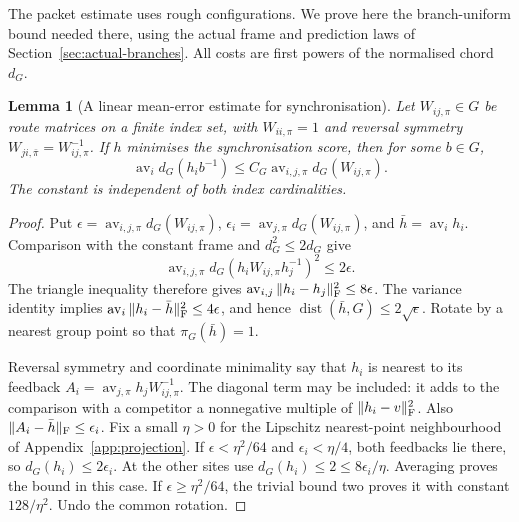 \documentclass[11pt,reqno]{amsart}
\numberwithin{equation}{section}
\newtheorem{lemma}[theorem]{Lemma}
\theoremstyle{definition}
\theoremstyle{remark}
\begin{document}
The packet estimate uses rough configurations. We prove here the
branch-uniform bound needed there, using the actual frame and
prediction laws of Section~\ref{sec:actual-branches}. All costs
are first powers of the normalised chord \(d_G\).

\begin{lemma}[A linear mean-error estimate for synchronisation]
\label{lem:packet-frame-mean}
Let \(W_{ij,\pi}\in G\) be route matrices on a finite index set,
with \(W_{ii,\pi}=1\) and reversal symmetry
\(W_{ji,\bar\pi}=W_{ij,\pi}^{-1}\). If \(h\) minimises the
synchronisation score, then for some \(b\in G\),
\[
 \operatorname{av}_i d_G(h_i b^{-1})
              \le C_G\operatorname{av}_{i,j,\pi}d_G(W_{ij,\pi}).
\]
The constant is independent of both index cardinalities.
\end{lemma}
\begin{proof}
Put \(\epsilon=\operatorname{av}_{i,j,\pi}d_G(W_{ij,\pi})\),
\(\epsilon_i=\operatorname{av}_{j,\pi}d_G(W_{ij,\pi})\), and
\(\bar h=\operatorname{av}_i h_i\). Comparison with the constant
frame and \(d_G^2\le2d_G\) give
\[
 \operatorname{av}_{i,j,\pi}d_G(h_iW_{ij,\pi}h_j^{-1})^2\le2\epsilon.
\]
The triangle inequality therefore gives
\(\operatorname{av}_{i,j}\|h_i-h_j\|_{\rm F}^2\le8\epsilon\).
The variance identity implies
\(\operatorname{av}_i\|h_i-\bar h\|_{\rm F}^2\le4\epsilon\),
and hence \(\operatorname{dist}(\bar h,G)\le2\sqrt\epsilon\).
Rotate by a nearest group point so that \(\pi_G(\bar h)=1\).

Reversal symmetry and coordinate minimality say that \(h_i\)
is nearest to its feedback
\(A_i=\operatorname{av}_{j,\pi}h_jW_{ij,\pi}^{-1}\).
The diagonal term may be included: it adds to the comparison
with a competitor a nonnegative multiple of
\(\|h_i-v\|_{\rm F}^2\). Also
\(\|A_i-\bar h\|_{\rm F}\le\epsilon_i\).
Fix a small \(\eta>0\) for the Lipschitz nearest-point
neighbourhood of Appendix~\ref{app:projection}.
If \(\epsilon<\eta^2/64\) and \(\epsilon_i<\eta/4\),
both feedbacks lie there, so
\(d_G(h_i)\le2\epsilon_i\). At the other sites use
\(d_G(h_i)\le2\le8\epsilon_i/\eta\).
Averaging proves the bound in this case. If
\(\epsilon\ge\eta^2/64\), the trivial bound two proves it
with constant \(128/\eta^2\). Undo the common rotation.
\end{proof}
\end{document}

